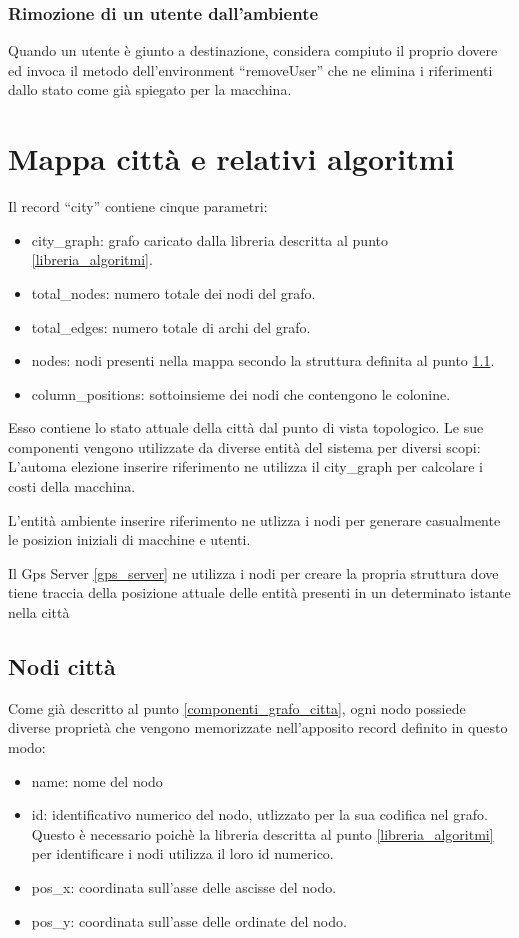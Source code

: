 \subsubsection{Rimozione di un utente dall'ambiente}
Quando un utente è giunto a destinazione, considera compiuto il proprio dovere ed invoca il metodo dell'environment ``removeUser'' che ne elimina i riferimenti dallo stato come già spiegato per la macchina.

\section{Mappa città e relativi algoritmi} \label{citta_e_algoritmi}
Il record ``city'' contiene cinque parametri:
\begin{itemize}
	\item city\_graph: grafo caricato dalla libreria descritta al punto \ref{libreria_algoritmi}.
	\item total\_nodes: numero totale dei nodi del grafo.
	\item total\_edges: numero totale di archi del grafo.
	\item nodes: nodi presenti nella mappa secondo la struttura definita al punto \ref{nodi_citta}.
	\item column\_positions: sottoinsieme dei nodi che contengono le colonine.
\end{itemize}

Esso contiene lo stato attuale della città dal punto di vista topologico. Le sue componenti vengono utilizzate da diverse entità del sistema per diversi scopi:
L'automa elezione inserire riferimento ne utilizza il city\_graph per calcolare i costi della macchina.

L'entità ambiente inserire riferimento ne utlizza i nodi per generare casualmente le posizion iniziali di macchine e utenti.

Il Gps Server \ref{gps_server} ne utilizza i nodi per creare la propria struttura dove tiene traccia della posizione attuale delle entità presenti in un determinato istante nella città

\subsection{Nodi città}\label{nodi_citta}
Come già descritto al punto \ref{componenti_grafo_citta}, ogni nodo possiede diverse proprietà che vengono memorizzate nell'apposito record definito in questo modo:
\begin{itemize}
	\item name: nome del nodo
	\item id: identificativo numerico del nodo, utlizzato per la sua codifica nel grafo. Questo è necessario poichè la libreria descritta al punto \ref{libreria_algoritmi} per identificare i nodi utilizza il loro id numerico.
	\item pos\_x: coordinata sull'asse delle ascisse del nodo.
	\item pos\_y: coordinata sull'asse delle ordinate del nodo.
\end{itemize}

